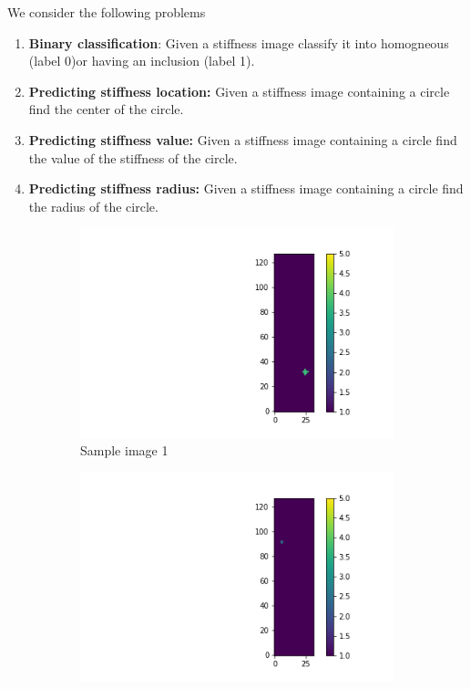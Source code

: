 \documentclass{article}
\begin{document}
We consider the following problems
\begin{enumerate}
\item{\textbf{Binary classification}: Given a stiffness image classify it into homogneous (label 0)or having an inclusion (label 1).}
\item{\textbf{Predicting stiffness location:} Given a stiffness image containing a circle find the center of the circle.}
\item{\textbf{Predicting stiffness value:} Given a stiffness image containing a circle find the value of the stiffness of the circle.}
\item{\textbf{Predicting stiffness radius:} Given a stiffness image containing a circle find the radius of the circle.}
\end{enumerate}
\begin{figure}
  \centering
  \begin{subfigure}[b]{0.45\textwidth}
    \centering
    \includegraphics[totalheight=4cm]{circle_id/sample0.png}
    \caption{Sample image 1}
  \end{subfigure}
  \begin{subfigure}[b]{0.45\textwidth}
    \centering
    \includegraphics[totalheight=4cm]{circle_id/sample1.png}

\end{subfigure}
\end{figure}
\end{document}
